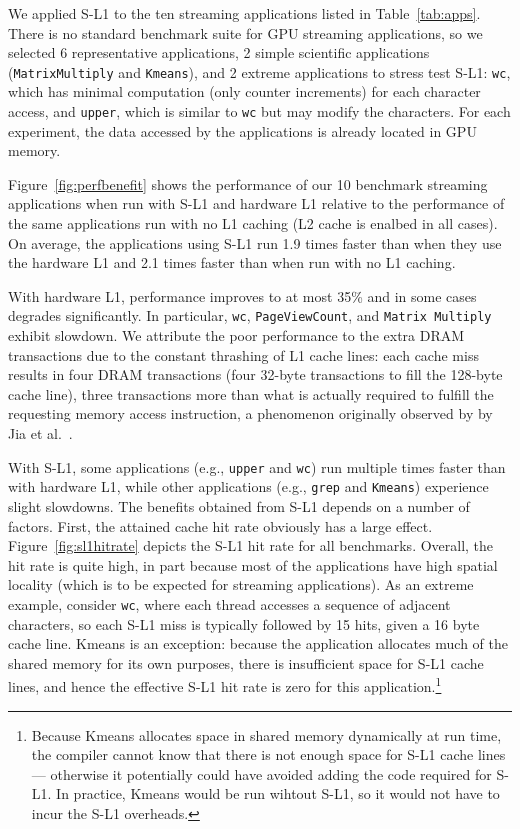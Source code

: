 We applied S-L1 to the ten streaming applications listed in Table~\ref{tab:apps}. 
There is no standard benchmark suite for GPU streaming applications, so we selected 6 representative applications, 2 simple scientific applications (\texttt{MatrixMultiply} and \texttt{Kmeans}), and 2 extreme applications to stress test S-L1: \texttt{wc}, which has minimal computation (only counter increments) for each character access, and \texttt{upper}, which is similar to \texttt{wc} but may modify the characters.
For each experiment, the data accessed by the applications is already located in GPU memory.


Figure~\ref{fig:perfbenefit} shows the performance of our 10 benchmark streaming applications when run with S-L1 and hardware L1 
relative to the performance of the same applications run with no L1 caching (L2 cache is enalbed in all cases).
On average, the applications using S-L1 run 1.9 times faster than when they use the hardware L1 and 2.1 times faster than when
run with no L1 caching.

With hardware L1, performance improves to at most 35\% and in some cases degrades significantly.
In particular, \texttt{wc},  \texttt{PageViewCount}, and \texttt{Matrix
Multiply} exhibit slowdown.
We attribute the poor performance to the extra DRAM transactions due to the
constant thrashing of L1 cache lines: each cache miss results in four DRAM
transactions (four 32-byte transactions to fill the 128-byte cache line), three
transactions more than what is actually required to fulfill the requesting
memory access instruction, a phenomenon originally observed by by Jia et al.~\cite{jia2012characterizing}.



With S-L1, some applications (e.g., \texttt{upper} and \texttt{wc}) run
multiple times faster than with hardware L1, while other applications (e.g., \texttt{grep}
and \texttt{Kmeans}) experience slight slowdowns. The benefits obtained from
S-L1 depends on a number of factors.
First, the attained cache hit rate obviously has a large effect.
Figure~\ref{fig:sl1hitrate} depicts the S-L1 hit rate for all benchmarks. 
Overall, the hit rate is quite high, in part because most of the applications have high spatial
locality (which is to be expected for streaming applications). 
As an extreme example, consider \texttt{wc}, where each thread accesses a sequence of adjacent characters, so each S-L1 miss is typically followed by 15 hits, given a 16 byte cache line.
Kmeans is an exception: because the application allocates much of the shared memory for its own purposes, there is insufficient space for S-L1 cache lines, and hence the effective S-L1 hit rate is zero for this application.\footnote{
	Because Kmeans allocates space in shared memory dynamically at run time,
	the compiler cannot know that there is not enough space for S-L1  cache lines ---
	otherwise it potentially could have avoided adding the code required for S-L1. In
	practice, Kmeans would be run wihtout S-L1, so it would not have to incur the S-L1 overheads.}

